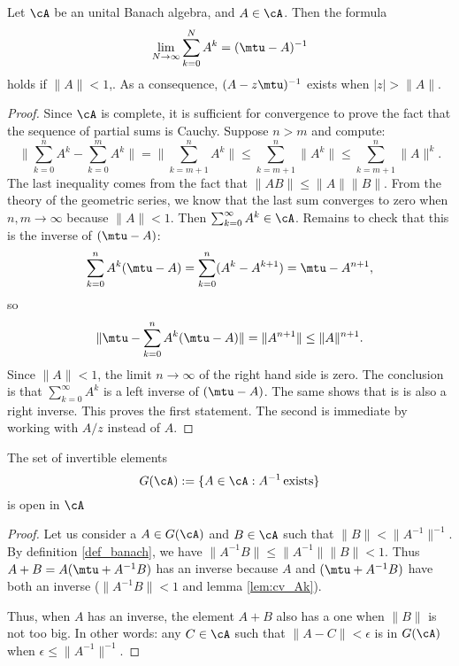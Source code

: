 \begin{lemma}\label{lem:cv_Ak}
Let $\cA$ be an unital Banach algebra, and $A\in\cA$. Then the formula
\begin{equation}
   \lim_{N\to\infty}\sum_{k=0}^{N}A^k = (\mtu-A)^{-1}
\end{equation}
holds if $\|A\|< 1$,. As a consequence, $(A-z\mtu)^{-1}$ exists when $|z|>\|A\|$.
\end{lemma}

\begin{proof}
	Since $\cA$ is complete, it is sufficient for convergence to prove the fact that the sequence of partial sums is Cauchy. Suppose $n>m$ and compute:
	\[
	  \| \sum_{k=0}^nA^k-\sum_{k=0}^mA^k  \|=\| \sum_{k=m+1}^nA^k \|\leq\sum_{k=m+1}^n\|A^k\|
	     \leq\sum_{k=m+1}^n\|A\|^k.
	\]
	The last inequality comes from the fact that $\|AB\|\leq\|A\|\|B\|$. From the theory of the geometric series, we know that the last sum converges to zero when $n,m\to\infty$ because $\|A\|<1$.
	Then 
	$   \sum_{k=0}^{\infty}A^k\in\cA$.
	Remains to check that this is the inverse of $(\mtu-A)$:
	\[
	   \sum_{k=0}^nA^k(\mtu-A)=\sum_{k=0}^n(A^k-A^{k+1})=\mtu-A^{n+1},
	\]
	so
	\[
	   \|\mtu-\sum_{k=0}^nA^k(\mtu-A)   \|=\|A^{n+1}\|\leq\|A\|^{n+1}.
	\]
	Since $\|A\|< 1$, the limit $n\to\infty$ of the right hand side is zero. The conclusion is that $\sum_{k=0}^{\infty}A^k$ is a left inverse of $(\mtu-A)$. The same shows that is is also a right inverse. This proves the first statement. The second is immediate by working with $A/z$ instead of $A$.

\end{proof}

\begin{lemma}
The set of invertible elements
\[
   G(\cA):=\{A\in\cA : A^{-1}\,\text{exists}\}
\]
is open in $\cA$
\end{lemma} \label{lem:G_ouvert}

\begin{proof}
	Let us consider a $A\in G(\cA)$ and $B\in\cA$ such that $\|B\|<\|A^{-1}\|^{-1}$. By definition \ref{def_banach}, we have $\|A^{-1} B\|\leq\|A^{-1}\|\|B\|<1$. Thus $A+B=A(\mtu+A^{-1} B)$ has an inverse because $A$ and $(\mtu+A^{-1} B)$ have both an inverse ($\|A^{-1} B\|<1$ and lemma \ref{lem:cv_Ak}).

	Thus, when $A$ has an inverse, the element $A+B$ also has a one when $\|B\|$ is not too big. In other words: any $C\in\cA$ such that $\|A-C\|<\epsilon$ is in $G(\cA)$ when $\epsilon\leq\|A^{-1}\|^{-1}$.
\end{proof}

